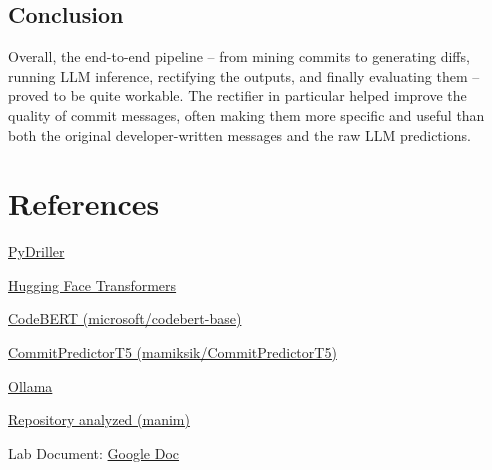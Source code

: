 \documentclass[10pt,a4paper]{report}
\begin{document}
\subsection{Conclusion}
Overall, the end-to-end pipeline -- from mining commits to generating diffs, running LLM inference, rectifying the outputs, and finally evaluating them -- proved to be quite workable. The rectifier in particular helped improve the quality of commit messages, often making them more specific and useful than both the original developer-written messages and the raw LLM predictions.


\section{References}
\begin{enumerate}[label={[\arabic*]}, itemsep=0.05em, topsep=0pt]
    \item \href{https://pydriller.readthedocs.io}{PyDriller}
    \item \href{https://huggingface.co/docs/transformers}{Hugging Face Transformers}
    \item \href{https://huggingface.co/microsoft/codebert-base}{CodeBERT (microsoft/codebert-base)}
    \item \href{https://huggingface.co/mamiksik/CommitPredictorT5}{CommitPredictorT5 (mamiksik/CommitPredictorT5)}
    \item \href{https://ollama.ai}{Ollama}
    \item \href{https://github.com/3b1b/manim}{Repository analyzed (manim)}
    \item Lab Document: \href{https://drive.google.com/file/d/1L4pCGQCekeELjgOJ4HxQ-Tso0QaOKIDf/view}{Google Doc}
\end{enumerate}
\end{document}
